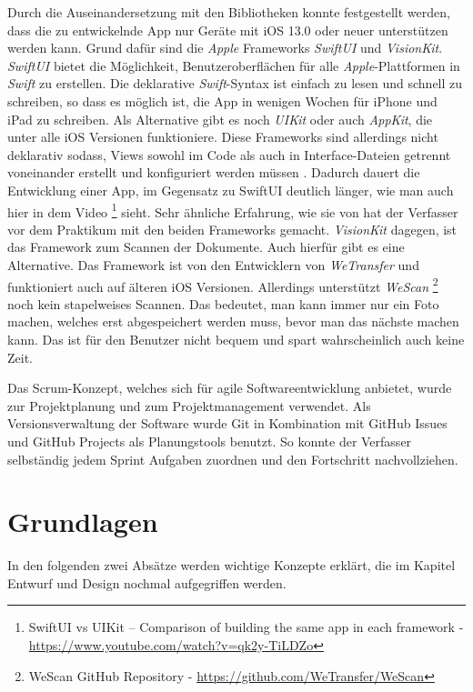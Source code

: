 \documentclass[nomenclature, onesided, 150]{HSMW-Thesis}
\begin{document}
		Durch die Auseinandersetzung mit den Bibliotheken konnte festgestellt werden, dass die zu entwickelnde App nur Geräte mit iOS 13.0 oder neuer unterstützen werden kann. Grund dafür sind die \textit{Apple} Frameworks \textit{SwiftUI} und \textit{VisionKit}. \textit{SwiftUI} bietet die Möglichkeit, Benutzeroberflächen für alle \textit{Apple}-Plattformen in \textit{Swift} zu erstellen. Die deklarative \textit{Swift}-Syntax ist einfach zu lesen und schnell zu schreiben, so dass es möglich ist, die App in wenigen Wochen für iPhone und iPad zu schreiben. Als Alternative gibt es noch \textit{UIKit} oder auch \textit{AppKit}, die unter alle iOS Versionen funktioniere. Diese Frameworks sind allerdings nicht deklarativ sodass, Views sowohl im Code als auch in Interface-Dateien getrennt voneinander erstellt und konfiguriert werden müssen \cite{sillmann_einstieg_nodate}. Dadurch dauert die Entwicklung einer App, im Gegensatz zu SwiftUI deutlich länger, wie man auch hier in dem Video \footnote{SwiftUI vs UIKit – Comparison of building the same app in each framework - \href{https://www.youtube.com/watch?v=qk2y-TiLDZo}{\url{https://www.youtube.com/watch?v=qk2y-TiLDZo}} } sieht. Sehr ähnliche Erfahrung, wie sie von  hat der Verfasser vor dem Praktikum mit den beiden Frameworks gemacht. \textit{VisionKit} dagegen, ist das Framework zum Scannen der Dokumente. Auch hierfür gibt es eine Alternative. Das Framework ist von den Entwicklern von \textit{WeTransfer} und funktioniert auch auf älteren iOS Versionen. Allerdings unterstützt \textit{WeScan} \footnote{WeScan GitHub Repository - \href{https://github.com/WeTransfer/WeScan}{\url{https://github.com/WeTransfer/WeScan}}} noch kein stapelweises Scannen. Das bedeutet, man kann immer nur ein Foto machen, welches erst abgespeichert werden muss, bevor man das nächste machen kann. Das ist für den Benutzer nicht bequem und spart wahrscheinlich auch keine Zeit.

		Das Scrum-Konzept, welches sich für agile Softwareentwicklung anbietet, wurde zur Projektplanung und zum Projektmanagement verwendet. Als Versionsverwaltung der Software wurde Git in Kombination mit GitHub Issues und GitHub Projects als Planungstools benutzt. So konnte der Verfasser selbständig jedem Sprint Aufgaben zuordnen und den Fortschritt nachvollziehen.

	\section{Grundlagen}
			In den folgenden zwei Absätze werden wichtige Konzepte erklärt, die im Kapitel Entwurf und Design nochmal aufgegriffen werden.
\end{document}
